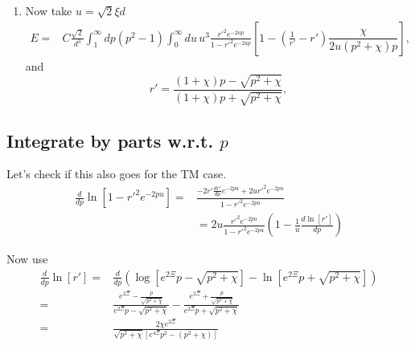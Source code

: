\begin{enumerate}
\item Now take $u = \sqrt{2}\xi d$ 
 \begin{align}
E%
=&  C\frac{\sqrt{2}}{d^3}\int_1^\infty dp (p^2-1)\int_0^\infty du\,u^{3} 
 \frac{r'^2e^{-2u p}}{1-r'^2e^{-2u p}}\left[1- \left(\frac{1}{r'}-r'\right)\dfrac{\chi }{2u(p^2+\chi)p}\right],
\end{align}
and 
\begin{equation}
r' =  \frac{(1+\chi)p-\sqrt{p^2 + \chi}}{(1+ \chi)p+\sqrt{p^2+\chi}},
\end{equation}
\end{enumerate}

\subsection{Integrate by parts w.r.t. $p$}
Let's check if this also goes for the TM case.  
\begin{align}
\frac{d}{dp}\ln[1-r'^2 e^{-2pu}] =& \frac{-2r' \frac{dr'}{dp} e^{-2pu} + 2u r'^2 e^{-2pu}}{1-r'^2 e^{-2pu}} \\
&= 2u\frac{r'^2 e^{-2pu}}{1-r'^2 e^{-2pu}}\left( 1 -\frac{1}{u} \frac{d\ln[r']}{dp}\right)
\end{align}

Now use 
\begin{align}
\frac{d}{dp}\ln[r'] =& \frac{d}{dp}\left(\log[e^{2\Xi}p - \sqrt{p^2+\chi}] -\ln[e^{2\Xi}p + \sqrt{p^2+\chi}]\right) \\
=& \frac{e^{2\Xi} - \frac{p}{\sqrt{p^2+\chi}}}{e^{2\Xi}p-\sqrt{p^2+\chi}} -\frac{e^{2\Xi} + \frac{p}{\sqrt{p^2+\chi}}}{e^{2\Xi}p + \sqrt{p^2+\chi}}\\ 
=& \frac{2\chi e^{2\Xi}}{\sqrt{p^2+\chi}[e^{4\Xi}p^2-(p^2+\chi)]}\label{eq:TM_integration_by_parts}
\end{align}

